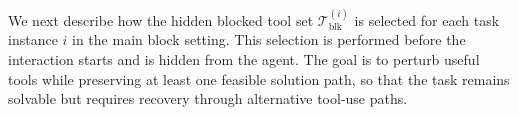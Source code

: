 \documentclass{llmxive}
\begin{document}


We next describe how the hidden blocked tool set $\mathcal{T}^{(i)}_{\mathrm{blk}}$ is selected for each task instance $i$ in the main block setting.
This selection is performed before the interaction starts and is hidden from the agent.
The goal is to perturb useful tools while preserving at least one feasible solution path, so that the task remains solvable but requires recovery through alternative tool-use paths.
\end{document}

